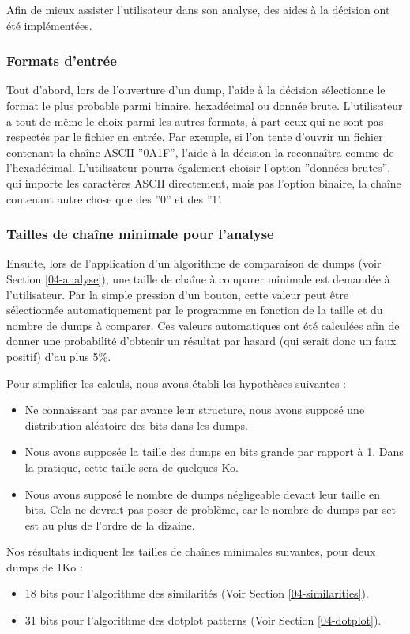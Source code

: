 Afin de mieux assister l'utilisateur dans son analyse, des aides à la décision ont été implémentées.

\subsubsection{Formats d'entrée}

Tout d'abord, lors de l'ouverture d'un dump, l'aide à la décision sélectionne le format le plus probable parmi binaire, hexadécimal ou donnée brute. L'utilisateur a tout de même le choix parmi les autres formats, à part ceux qui ne sont pas respectés par le fichier en entrée.
Par exemple, si l'on tente d'ouvrir un fichier contenant la chaîne ASCII ''0A1F'', l'aide à la décision la reconnaîtra comme de l'hexadécimal. L'utilisateur pourra également choisir l'option ''données brutes'', qui importe les caractères ASCII directement, mais pas l'option binaire, la chaîne contenant autre chose que des ''0'' et des ''1'.

\subsubsection{Tailles de chaîne minimale pour l'analyse}

Ensuite, lors de l'application d'un algorithme de comparaison de dumps (voir Section \ref{04-analyse}), une taille de chaîne à comparer minimale est demandée à l'utilisateur. Par la simple pression d'un bouton, cette valeur peut être sélectionnée automatiquement par le programme en fonction de la taille et du nombre de dumps à comparer.
Ces valeurs automatiques ont été calculées afin de donner une probabilité d'obtenir un résultat par hasard (qui serait donc un faux positif) d'au plus 5\%.

Pour simplifier les calculs, nous avons établi les hypothèses suivantes :
\begin{itemize}
	\item Ne connaissant pas par avance leur structure, nous avons supposé une distribution aléatoire des bits dans les dumps.
	\item Nous avons supposée la taille des dumps en bits grande par rapport à 1. Dans la pratique, cette taille sera de quelques Ko.
	\item Nous avons supposé le nombre de dumps négligeable devant leur taille en bits. Cela ne devrait pas poser de problème, car le nombre de dumps par set est au plus de l'ordre de la dizaine.
\end{itemize}
Nos résultats indiquent les tailles de chaînes minimales suivantes, pour deux dumps de 1Ko :
\begin{itemize}
	\item 18 bits pour l'algorithme des similarités (Voir Section \ref{04-similarities}).
	\item 31 bits pour l'algorithme des dotplot patterns (Voir Section \ref{04-dotplot}).
\end{itemize}